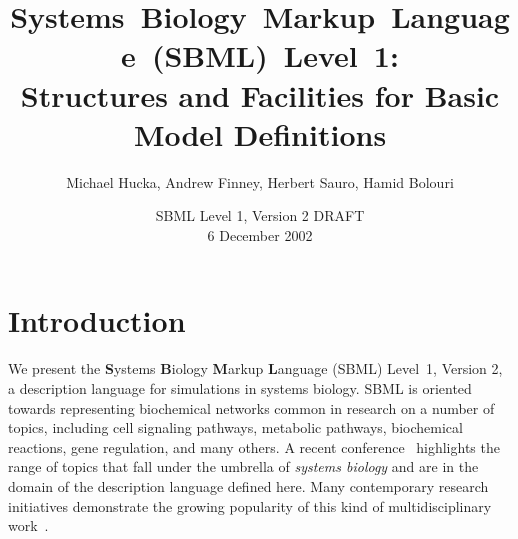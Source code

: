 \documentclass[10pt]{cekarticle}
\newcommand{\changed}[1]{\textcolor{BrickRed}{#1}}
\begin{document}

\title{\mbox{Systems Biology Markup Language (SBML) Level 1:}\\
  Structures and Facilities for Basic Model Definitions}

\author{Michael Hucka, Andrew Finney, Herbert Sauro, Hamid Bolouri}


\address{Systems Biology Workbench Development Group\\
  JST ERATO Kitano Symbiotic Systems Project\\
  Control and Dynamical Systems, MC 107-81\\
  California Institute of Technology, Pasadena, CA 91125, USA\\[3pt]
  \url{http://www.cds.caltech.edu/erato}}



\date{\vspace*{-1ex}SBML Level 1, \changed{Version 2 DRAFT}\\[3pt]
  6 December 2002\vspace*{-10pt}}

\renewcommand{\baselinestretch}{0.96}
\maketitlepage
\renewcommand{\baselinestretch}{0.98}


\section{Introduction}
\label{sec:introduction}

We present the \textbf{S}ystems \textbf{B}iology \textbf{M}arkup
\textbf{L}anguage (SBML) Level~1\changed{, Version 2}, a description
language for simulations in systems biology.  SBML is oriented towards
representing biochemical networks common in research on a number of topics,
including cell signaling pathways, metabolic pathways, biochemical
reactions, gene regulation, and many others.  A recent
conference~\citep{kitano:2001} highlights the range of topics that fall
under the umbrella of \emph{systems biology} and are in the domain of the
description language defined here.  Many contemporary research initiatives
demonstrate the growing popularity of this kind of multidisciplinary
work~\cite[e.g.,][]{abbott:1999,gilman:2000,popel:1998,smaglik:2000,smaglik:2000b}.
\end{document}
